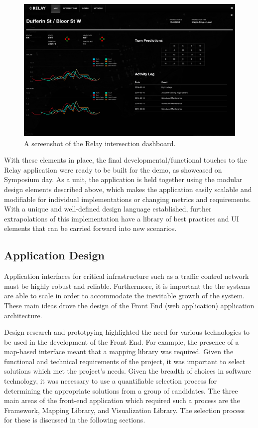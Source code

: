 \documentclass{report}
\begin{document}
\begin{figure}[htbp!]
  \begin{centering}
    \includegraphics[scale=0.73]{figures/dashboard.png}
    \caption{A screenshot of the Relay intersection dashboard.}
    \label{fig:dashboardt}
  \end{centering}
\end{figure}

With these elements in place, the final developmental/functional touches to the Relay application were ready to be built for the demo, as showcased on Symposium day.
As a unit, the application is held together using the modular design elements described above, which makes the application easily scalable and modifiable for individual implementations or changing metrics and requirements.
With a unique and well-defined design language established, further extrapolations of this implementation have a library of best practices and UI elements that can be carried forward into new scenarios.

\subsection{Application Design}

Application interfaces for critical infrastructure such as a traffic control network must be highly robust and reliable. Furthermore, it is important the the systems are able to scale in order to accommodate the inevitable growth of the system. These main ideas drove the design of the Front End (web application) application architecture. 

Design research and prototpying highlighted the need for various technologies to be used in the development of the Front End. For example, the presence of a map-based interface meant that a mapping library was required. Given the functional and technical requirements of the project, it was important to select solutions which met the project's needs. Given the breadth of choices in software technology, it was necessary to use a quantifiable selection process for determining the appropriate solutions from a group of candidates. The three main areas of the front-end application which required such a process are the Framework, Mapping Library, and Visualization Library. The selection process for these is discussed in the following sections.
\end{document}

